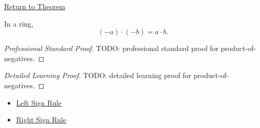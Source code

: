 \newpage
{}
\label{prf:product-of-negatives}

\begin{remark*}[Return]
\hyperref[prop:product-of-negatives]{Return to Theorem}
\end{remark*}

\begin{proposition*}
In a ring,
\[
(-a)\cdot(-b)=a\cdot b.
\]
\end{proposition*}

\begin{proof}[Professional Standard Proof]
\LRAProofBodyStart
TODO: professional standard proof for product-of-negatives.
\end{proof}

\begin{proof}[Detailed Learning Proof]
\LRAProofBodyStart
TODO: detailed learning proof for product-of-negatives.
\end{proof}

\begin{remark*}
\end{remark*}

\begin{dependencies}
\begin{itemize}
  \item \hyperref[prop:left-sign-rule]{Left Sign Rule}
  \item \hyperref[prop:right-sign-rule]{Right Sign Rule}
\end{itemize}
\end{dependencies}

\clearpage
